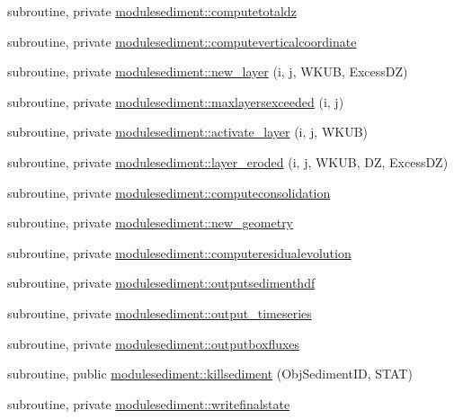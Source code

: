 \begin{DoxyCompactItemize}
subroutine, private \mbox{\hyperlink{namespacemodulesediment_a9aa4c5d236de77268f5aa5b54dfdab36}{modulesediment\+::computetotaldz}}
\item 
subroutine, private \mbox{\hyperlink{namespacemodulesediment_ae2d0c9fdf078f2fd81047486eb734a9d}{modulesediment\+::computeverticalcoordinate}}
\item 
subroutine, private \mbox{\hyperlink{namespacemodulesediment_acfebb5e32f4481cbb0199b98dc4ff545}{modulesediment\+::new\+\_\+layer}} (i, j, W\+K\+UB, Excess\+DZ)
\item 
subroutine, private \mbox{\hyperlink{namespacemodulesediment_aac53266b3dac9076f1df37c49e676383}{modulesediment\+::maxlayersexceeded}} (i, j)
\item 
subroutine, private \mbox{\hyperlink{namespacemodulesediment_a2047f2985bf32ff5a12cbd0def21cf95}{modulesediment\+::activate\+\_\+layer}} (i, j, W\+K\+UB)
\item 
subroutine, private \mbox{\hyperlink{namespacemodulesediment_aba4245ac07452ebcf189f0cf9617d234}{modulesediment\+::layer\+\_\+eroded}} (i, j, W\+K\+UB, DZ, Excess\+DZ)
\item 
subroutine, private \mbox{\hyperlink{namespacemodulesediment_a513f33f980769b37c74ea34212fad388}{modulesediment\+::computeconsolidation}}
\item 
subroutine, private \mbox{\hyperlink{namespacemodulesediment_aa3fda34444f716aac00714d297af27d3}{modulesediment\+::new\+\_\+geometry}}
\item 
subroutine, private \mbox{\hyperlink{namespacemodulesediment_ad51d2a28e0487a18346c78ef17c13307}{modulesediment\+::computeresidualevolution}}
\item 
subroutine, private \mbox{\hyperlink{namespacemodulesediment_abfa4d5937f78f3781b6b3108b8068185}{modulesediment\+::outputsedimenthdf}}
\item 
subroutine, private \mbox{\hyperlink{namespacemodulesediment_a5763876f73ef752f30208f2fd9aba61e}{modulesediment\+::output\+\_\+timeseries}}
\item 
subroutine, private \mbox{\hyperlink{namespacemodulesediment_abf7a07c3cdbe931d82c21146e433eaeb}{modulesediment\+::outputboxfluxes}}
\item 
subroutine, public \mbox{\hyperlink{namespacemodulesediment_a3799836daf0cb05055644810de5e7fd0}{modulesediment\+::killsediment}} (Obj\+Sediment\+ID, S\+T\+AT)
\item 
subroutine, private \mbox{\hyperlink{namespacemodulesediment_a1f674dbab21e666bea43953621c4cce3}{modulesediment\+::writefinalstate}}

\end{DoxyCompactItemize}

